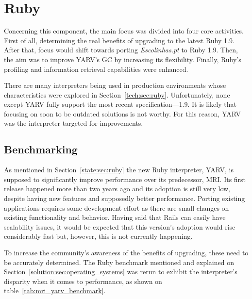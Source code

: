 \section{Ruby} %
\label{solution:sec:ruby}

Concerning this component, the main focus was divided into four core activities. First of all, determining the real benefits of upgrading to the latest Ruby 1.9. After that, focus would shift towards porting \textit{Escolinhas.pt} to Ruby 1.9. Then, the aim was to improve YARV's GC by increasing its flexibility. Finally, Ruby's profiling and information retrieval capabilities were enhanced.

There are many interpreters being used in production environments whose characteristics were explored in Section~\ref{tech:sec:ruby}. Unfortunately, none except YARV fully support the most recent specification---1.9. It is likely that focusing on soon to be outdated solutions is not worthy. For this reason, YARV was the interpreter targeted for improvements.


\subsection{Benchmarking}
As mentioned in Section~\ref{state:sec:ruby} the new Ruby interpreter, YARV, is supposed to significantly improve performance over its predecessor, MRI. Its first release happened more than two years ago and its adoption is still very low, despite having new features and supposedly better performance. Porting existing applications requires some development effort as there are small changes on existing functionality and behavior. Having said that Rails can easily have scalability issues, it would be expected that this version's adoption would rise considerably fast but, however, this is not currently happening.

To increase the community's awareness of the benefits of upgrading, these need to be accurately determined. The Ruby benchmark mentioned and explained on Section~\ref{solution:sec:operating_systems} was rerun to exhibit the interpreter's disparity when it comes to performance, as shown on table~\ref{tab:mri_yarv_benchmark}.

